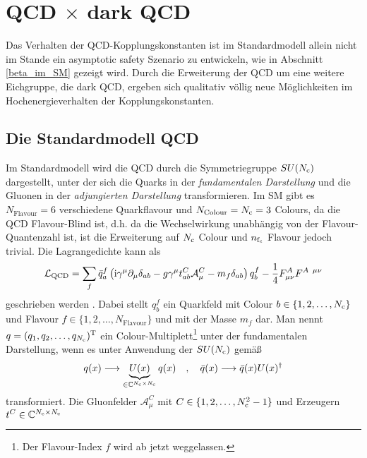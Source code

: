 \clearpage
\section{QCD $\times$ dark QCD}
  
  Das Verhalten der QCD-Kopplungskonstanten ist im Standardmodell allein nicht 
  im Stande ein asymptotic safety Szenario zu entwickeln, wie in Abschnitt 
  \ref{beta_im_SM} gezeigt wird. Durch die 
  Erweiterung der QCD um eine weitere Eichgruppe, die dark QCD, ergeben sich 
  qualitativ völlig neue Möglichkeiten im Hochenergieverhalten der 
  Kopplungskonstanten. 
  
  \subsection{Die Standardmodell QCD}
    Im Standardmodell wird die QCD durch die Symmetriegruppe $SU(N_\text{c})$ 
    dargestellt, unter der sich die Quarks in der 
    \textit{fundamentalen Darstellung} und die Gluonen in der 
    \textit{adjungierten Darstellung} transformieren. Im SM gibt es 
    $N_\text{Flavour}=6$
    verschiedene Quarkflavour und $N_\text{Colour}=N_\text{c}=3$ Colours, da die QCD 
    Flavour-Blind ist, d.h. da die Wechselwirkung unabhängig von der 
    Flavour-Quantenzahl ist, ist die 
    Erweiterung auf $N_\text{c}$ Colour und $n_{\text{f}_\text{c}}$ Flavour jedoch trivial. Die 
    Lagrangedichte kann als 
    \begin{equation}
     \mathcal{L}_\text{QCD} = \sum\limits_f \bar{q}_a^f \left( 
     \text{i} \gamma^\mu \partial_\mu \delta_{ab} 
     -g \gamma^\mu t^C_{ab} \mathcal{A}_\mu^C
     -m_f \delta_{ab}
     \right)q_b^f -\frac{1}{4} F_{\mu \nu}^A F^{A \,\,\, \mu\nu}
    \end{equation}
    geschrieben werden \cite{PDG:QCD}. Dabei stellt $q_b^f$ ein Quarkfeld mit 
    Colour $b\in \{1,2,\ldots,N_\text{c}\}$ und Flavour $f\in\{1,2,\ldots , 
    N_\text{Flavour}\}$ 
    und mit der Masse 
    $m_f$ dar. Man nennt $q=(q_1,q_2,\ldots,q_{N_\text{c}})^\text{T}$ ein 
    Colour-Multiplett\footnote{Der Flavour-Index $f$ wird ab jetzt 
    weggelassen.} unter der fundamentalen Darstellung, wenn es unter 
    Anwendung der $SU(N_\text{c})$ gemäß
    \begin{equation}
      q(x) \longrightarrow \underbrace{U(x)}_{\in \mathbb{C}^{N_\text{c}\times N_\text{c}}}
      q(x) \quad ,\quad \bar{q}(x) \longrightarrow\bar{q}(x) U(x)^\dagger
    \end{equation}
    transformiert. Die Gluonfelder $\mathcal{A}_\mu^C$ mit $C\in\{1,2,\ldots,
    N_\text{c}^2-1\}$ und Erzeugern $t^C\in \mathbb{C}^{N_\text{c}\times N_\text{c}}$ 
